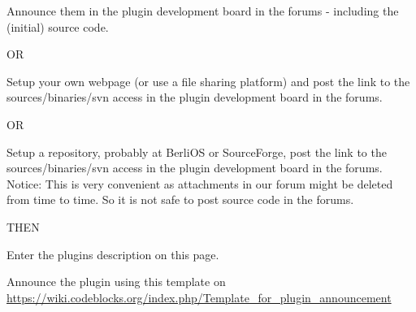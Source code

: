 \tab Announce them in the plugin development board in the forums - including the (initial) source code.

OR

\tab Setup your own webpage (or use a file sharing platform) and post the link to the sources/binaries/svn access in the plugin development board in the forums.

OR

\tab Setup a repository, probably at BerliOS or SourceForge, post the link to the sources/binaries/svn access in the plugin development board in the forums. Notice: This is very convenient as attachments in our forum might be deleted from time to time. So it is not safe to post source code in the forums.

THEN

\tab Enter the plugins description on this page.

\tab Announce the plugin using this template on \url{https://wiki.codeblocks.org/index.php/Template_for_plugin_announcement}

\begin{ASTYLE}

\end{ASTYLE}

\begin{AUTOVERSIONING}

\end{AUTOVERSIONING}

\begin{BROWSETRACKS}

\end{BROWSETRACKS}

\begin{CODESNIPPETS}

\end{CODESNIPPETS}

\begin{CODECOMPLETION}

\end{CODECOMPLETION}

\begin{CSCOPE}

\end{CSCOPE}

\begin{DOXYBLOCKS}

\end{DOXYBLOCKS}

\begin{EDITORTWEAKS}

\end{EDITORTWEAKS}

\begin{ENVVAR}

\end{ENVVAR}

